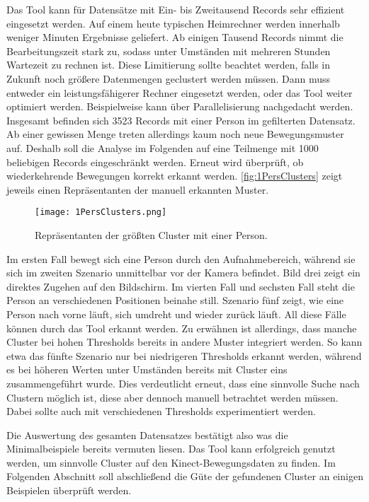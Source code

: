 Das Tool kann für Datensätze mit Ein- bis Zweitausend Records sehr effizient eingesetzt werden.
Auf einem heute typischen Heimrechner werden innerhalb weniger Minuten Ergebnisse geliefert.
Ab einigen Tausend Records nimmt die Bearbeitungszeit stark zu,
sodass unter Umständen mit mehreren Stunden Wartezeit zu rechnen ist.
Diese Limitierung sollte beachtet werden,
falls in Zukunft noch größere Datenmengen geclustert werden müssen.
Dann muss entweder ein leistungsfähigerer Rechner eingesetzt werden,
oder das Tool weiter optimiert werden.
Beispielweise kann über Parallelisierung nachgedacht werden.
Insgesamt befinden sich 3523 Records mit einer Person im gefilterten Datensatz.
Ab einer gewissen Menge treten allerdings kaum noch neue Bewegungsmuster auf.
Deshalb soll die Analyse im Folgenden auf eine Teilmenge mit 1000 beliebigen Records eingeschränkt werden.
Erneut wird überprüft, ob wiederkehrende Bewegungen korrekt erkannt werden.
\autoref{fig:1PersClusters} zeigt jeweils einen Repräsentanten der manuell erkannten Muster.
\begin{figure}[ht]
    \begin{center}
    \texttt{[image: 1PersClusters.png]}
    \end{center}
    \caption{Repräsentanten der größten Cluster mit einer Person.}
    \label{fig:1PersClusters}
\end{figure}
Im ersten Fall bewegt sich eine Person durch den Aufnahmebereich,
während sie sich im zweiten Szenario unmittelbar vor der Kamera befindet.
Bild drei zeigt ein direktes Zugehen auf den Bildschirm.
Im vierten Fall und sechsten Fall steht die Person an verschiedenen Positionen beinahe still.
Szenario fünf zeigt, wie eine Person nach vorne läuft,
sich umdreht und wieder zurück läuft.
All diese Fälle können durch das Tool erkannt werden.
Zu erwähnen ist allerdings, dass manche Cluster bei hohen Thresholds bereits in andere Muster integriert werden.
So kann etwa das fünfte Szenario nur bei niedrigeren Thresholds erkannt werden,
während es bei höheren Werten unter Umständen bereits mit Cluster eins zusammengeführt wurde.
Dies verdeutlicht erneut, dass eine sinnvolle Suche nach Clustern möglich ist,
diese aber dennoch manuell betrachtet werden müssen.
Dabei sollte auch mit verschiedenen Thresholds experimentiert werden.

Die Auswertung des gesamten Datensatzes bestätigt also was die Minimalbeispiele bereits vermuten liesen.
Das Tool kann erfolgreich genutzt werden, um sinnvolle Cluster auf den Kinect-Bewegungsdaten zu finden.
Im Folgenden Abschnitt soll abschließend die Güte der gefundenen Cluster an einigen Beispielen
überprüft werden.

